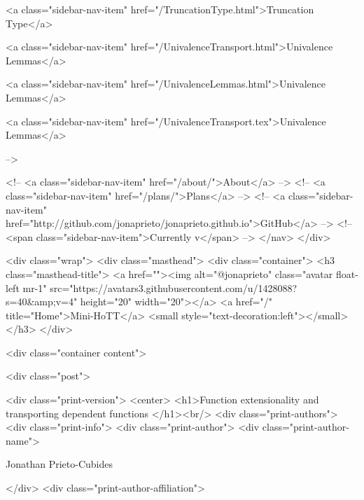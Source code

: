       
    
      
        
          <a class="sidebar-nav-item" href="/TruncationType.html">Truncation Type</a>
        
      
    
      
        
          <a class="sidebar-nav-item" href="/UnivalenceTransport.html">Univalence Lemmas</a>
        
      
    
      
        
          <a class="sidebar-nav-item" href="/UnivalenceLemmas.html">Univalence Lemmas</a>
        
      
    
      
        
          <a class="sidebar-nav-item" href="/UnivalenceTransport.tex">Univalence Lemmas</a>
        
      
     -->

    <!-- <a class="sidebar-nav-item" href="/about/">About</a> -->
    <!-- <a class="sidebar-nav-item" href="/plans/">Plans</a> -->
    <!-- <a class="sidebar-nav-item" href="http://github.com/jonaprieto/jonaprieto.github.io">GitHub</a> -->
    <!-- <span class="sidebar-nav-item">Currently v</span> -->
  </nav>
</div>

    <div class="wrap">
      <div class="masthead">
        <div class="container">
          <h3 class="masthead-title">
            <a href=""><img alt="@jonaprieto" class="avatar float-left mr-1" src="https://avatars3.githubusercontent.com/u/1428088?s=40&amp;v=4" height="20" width="20"></a>
            <a href="/" title="Home">Mini-HoTT</a>
            <small style="text-decoration:left"></small>
          </h3>
        </div>
      
      <div class="container content">
        







<div class="post">

  <div class="print-version">
    <center>
      <h1>Function extensionality and transporting dependent functions </h1><br/>
        <div class="print-authors">
          <div class="print-info">
            <div class="print-author">
              <div class="print-author-name">
                
                  Jonathan Prieto-Cubides
                
              </div>
              <div class="print-author-affiliation">
                
